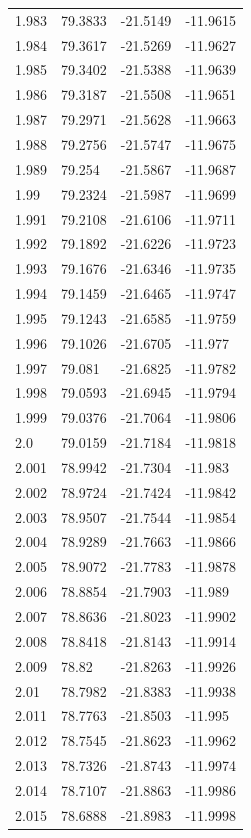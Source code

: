 \begin{tabular}{llll}
1.983 & 79.3833 & -21.5149 & -11.9615 \\
1.984 & 79.3617 & -21.5269 & -11.9627 \\
1.985 & 79.3402 & -21.5388 & -11.9639 \\
1.986 & 79.3187 & -21.5508 & -11.9651 \\
1.987 & 79.2971 & -21.5628 & -11.9663 \\
1.988 & 79.2756 & -21.5747 & -11.9675 \\
1.989 & 79.254 & -21.5867 & -11.9687 \\
1.99 & 79.2324 & -21.5987 & -11.9699 \\
1.991 & 79.2108 & -21.6106 & -11.9711 \\
1.992 & 79.1892 & -21.6226 & -11.9723 \\
1.993 & 79.1676 & -21.6346 & -11.9735 \\
1.994 & 79.1459 & -21.6465 & -11.9747 \\
1.995 & 79.1243 & -21.6585 & -11.9759 \\
1.996 & 79.1026 & -21.6705 & -11.977 \\
1.997 & 79.081 & -21.6825 & -11.9782 \\
1.998 & 79.0593 & -21.6945 & -11.9794 \\
1.999 & 79.0376 & -21.7064 & -11.9806 \\
2.0 & 79.0159 & -21.7184 & -11.9818 \\
2.001 & 78.9942 & -21.7304 & -11.983 \\
2.002 & 78.9724 & -21.7424 & -11.9842 \\
2.003 & 78.9507 & -21.7544 & -11.9854 \\
2.004 & 78.9289 & -21.7663 & -11.9866 \\
2.005 & 78.9072 & -21.7783 & -11.9878 \\
2.006 & 78.8854 & -21.7903 & -11.989 \\
2.007 & 78.8636 & -21.8023 & -11.9902 \\
2.008 & 78.8418 & -21.8143 & -11.9914 \\
2.009 & 78.82 & -21.8263 & -11.9926 \\
2.01 & 78.7982 & -21.8383 & -11.9938 \\
2.011 & 78.7763 & -21.8503 & -11.995 \\
2.012 & 78.7545 & -21.8623 & -11.9962 \\
2.013 & 78.7326 & -21.8743 & -11.9974 \\
2.014 & 78.7107 & -21.8863 & -11.9986 \\
2.015 & 78.6888 & -21.8983 & -11.9998 \\

\end{tabular}
